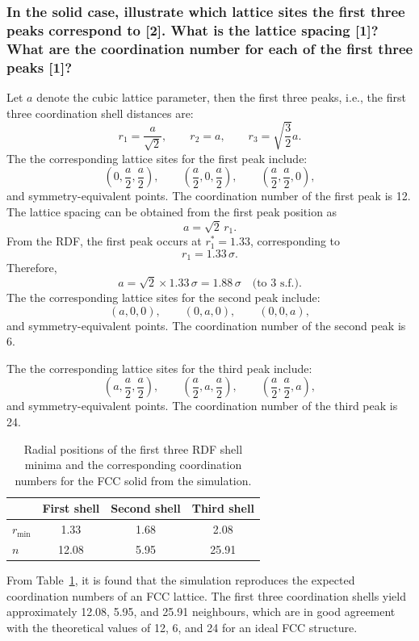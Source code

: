 \documentclass[a4paper,10pt,twocolumn]{article}
\begin{document}
\subsubsection*{In the solid case, illustrate which lattice sites the first three peaks correspond to [2]. What is the lattice spacing [1]? What are the coordination number for each of the first three peaks [1]?}
Let $a$ denote the cubic lattice parameter, then the first three peaks, i.e., the first three coordination shell distances are:
\[
r_1=\frac{a}{\sqrt2},\qquad r_2=a,\qquad r_3=\sqrt{\frac{3}{2}}a.
\]
The the corresponding lattice sites for the first peak include:
\[
\left(0,\frac{a}{2},\frac{a}{2}\right),\qquad \left(\frac{a}{2},0,\frac{a}{2}\right),\qquad \left(\frac{a}{2},\frac{a}{2},0\right),
\]
and symmetry-equivalent points. The coordination number of the first peak is 12. The lattice spacing can be obtained from the first peak position as
\[
a=\sqrt{2}\,r_1 .
\]
From the RDF, the first peak occurs at $r_1^*=1.33$, corresponding to
\[
r_1 = 1.33\,\sigma .
\]
Therefore,
\[
a=\sqrt{2}\times1.33\,\sigma = 1.88\,\sigma \quad \text{(to 3 s.f.)}.
\]
The the corresponding lattice sites for the second peak include:
\[
\left(a,0,0\right),\qquad \left(0,a,0\right),\qquad \left(0,0,a\right),
\]
and symmetry-equivalent points. The coordination number of the second peak is 6.

The the corresponding lattice sites for the third peak include:
\[
\left(a,\frac{a}{2},\frac{a}{2}\right),\qquad
\left(\frac{a}{2},a,\frac{a}{2}\right),\qquad
\left(\frac{a}{2},\frac{a}{2},a\right),
\]
and symmetry-equivalent points. The coordination number of the third peak is 24.

\begin{table}[H]
\centering
\caption{Radial positions of the first three RDF shell minima and the corresponding coordination numbers for the FCC solid from the simulation.}
\label{tab:fcc_shells}
\begin{tabular}{lccc}
\toprule
 & First shell & Second shell & Third shell \\
\midrule
$r_{\min}$ & 1.33 & 1.68 & 2.08 \\
$n$ & 12.08 & 5.95 & 25.91 \\
\bottomrule
\end{tabular}
\end{table}

From Table~\ref{tab:fcc_shells}, it is found that the simulation reproduces the expected coordination numbers of an FCC lattice. The first three coordination shells yield approximately 12.08, 5.95, and 25.91 neighbours, which are in good agreement with the theoretical values of 12, 6, and 24 for an ideal FCC structure.
\end{document}
